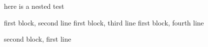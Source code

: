 here is a nested test
\begin{one}
		first block, second line
		first block, third line
		first block, fourth line
	\begin{two} second block, first line \end{two} \end{one}
